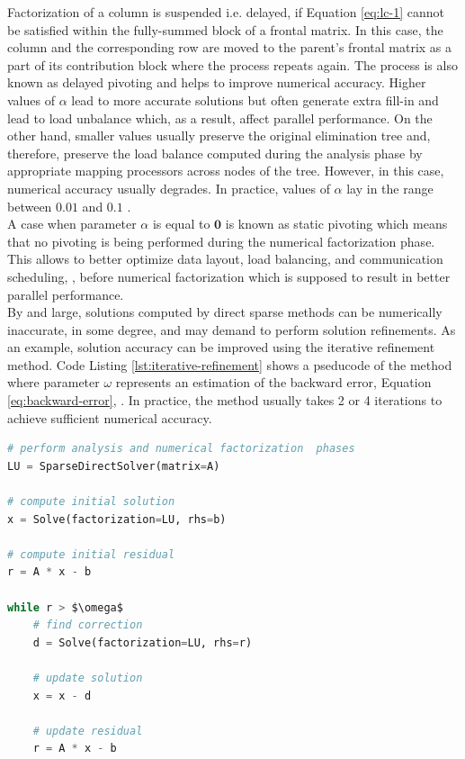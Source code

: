 Factorization of a column is suspended i.e. delayed, if Equation \ref{eq:lc-1} cannot be satisfied within the fully-summed block of a frontal matrix. In this case, the column and the corresponding row are moved to the parent's frontal matrix as a part of its contribution block where the process repeats again. The process is also known as delayed pivoting and helps to improve numerical accuracy. Higher values of $\alpha$ lead to more accurate solutions but often generate extra fill-in and lead to load unbalance which, as a result, affect parallel performance. On the other hand, smaller values usually preserve the original elimination tree and, therefore,  preserve the load balance computed during the analysis phase by appropriate mapping  processors across nodes of the tree. However, in this case, numerical accuracy usually degrades. In practice, values of $\alpha$ lay in the range between $0.01$ and $0.1$ \cite{mumps-manual}.\\



A case when parameter $\alpha$ is equal to $\bm{0}$ is known as static pivoting which means that no pivoting is being performed during the numerical factorization phase. This allows to better optimize data layout, load balancing, and communication scheduling, \cite{superlu-manual}, before numerical factorization which is supposed to result in better parallel performance.\\



By and large, solutions computed by direct sparse methods can be numerically inaccurate, in some degree, and may demand to perform solution refinements. As an example, solution accuracy can be improved using the iterative refinement method. Code Listing \ref{lst:iterative-refinement} shows a pseducode of the method where parameter $\omega$ represents an estimation of the backward error, Equation \ref{eq:backward-error}, \cite{mm-backward-error}. In practice, the method usually takes 2 or 4 iterations to achieve sufficient numerical accuracy.\\

\begin{minipage}{\linewidth}
\begin{lstlisting}[language=python, caption={Pseudocode of the iterative refinement method}, frame=single, label={lst:iterative-refinement}]
# perform analysis and numerical factorization  phases
LU = SparseDirectSolver(matrix=A)

# compute initial solution
x = Solve(factorization=LU, rhs=b)

# compute initial residual
r = A * x - b

while r > $\omega$
	# find correction
	d = Solve(factorization=LU, rhs=r)
	
	# update solution
	x = x - d
	
	# update residual
	r = A * x - b
\end{lstlisting}
\end{minipage}

